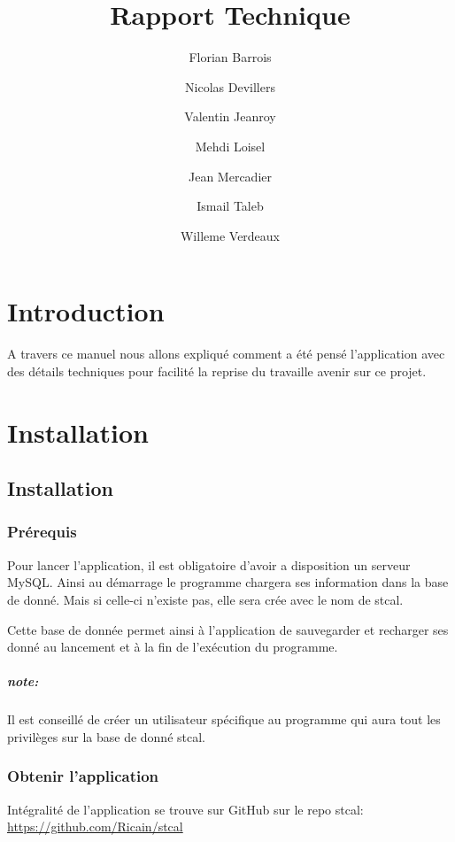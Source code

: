 \documentclass[a4paper,10pt]{report}
\title{Rapport Technique}
\author{Florian Barrois \and Nicolas Devillers \and Valentin Jeanroy \and Mehdi Loisel \and Jean Mercadier \and Ismail Taleb \and Willeme Verdeaux}
\begin{document}
\thispagestyle{headings}

\maketitle

\tableofcontents

\chapter*{Introduction}

A travers ce manuel nous allons expliqué comment a été pensé l'application avec des détails techniques pour facilité la reprise du travaille avenir sur ce projet.

\chapter{Installation}

	\section{Installation}

		\subsection{Prérequis}

			Pour lancer l'application, il est obligatoire d'avoir a disposition un serveur MySQL. Ainsi au démarrage le programme chargera ses information dans la base de donné. Mais si celle-ci n'existe pas, elle sera crée avec le nom de stcal.

			Cette base de donnée permet ainsi à l'application de sauvegarder et recharger ses donné au lancement et à la fin de l’exécution du programme.

			\paragraph*{note:}
			Il est conseillé de créer un utilisateur spécifique au programme qui aura tout les privilèges sur la base de donné stcal.

		\subsection{Obtenir l'application}

			Intégralité de l'application se trouve sur GitHub sur le repo stcal: \href{https://github.com/Ricain/stcal}{https://github.com/Ricain/stcal}
	
\end{document}

